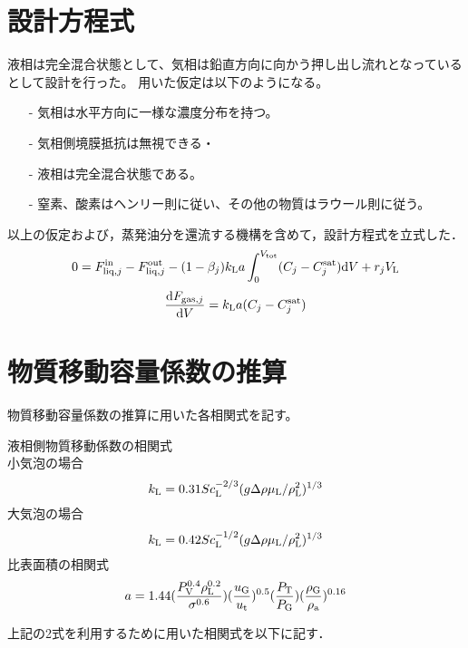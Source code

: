 \documentclass[a4j]{jsreport}
\begin{document}
\section{設計方程式}
液相は完全混合状態として、気相は鉛直方向に向かう押し出し流れとなっているとして設計を行った。
用いた仮定は以下のようになる。
\begin{itemize}
    \item[-] 気相は水平方向に一様な濃度分布を持つ。
    \item[-] 気相側境膜抵抗は無視できる・
    \item[-] 液相は完全混合状態である。
    \item[-] 窒素、酸素はヘンリー則に従い、その他の物質はラウール則に従う。
\end{itemize}
以上の仮定および，蒸発油分を還流する機構を含めて，設計方程式を立式した．\\
\begin{equation}\nonumber
    0=F^{{\rm in}}_{{\rm liq},j}-F^{{\rm out}}_{{\rm liq},j} -(1-\beta_j) k_{{\rm L}}a
    \int^{V_{{\rm tot}}}_0(C_j - C^{{\rm sat}}_j){\rm d}V + r_j V_{{\rm L}}
\end{equation}
\begin{equation}\nonumber
    \frac{{\rm d}F_{{\rm gas},j}}{{\rm d}V} = k_{{\rm L}}a(C_j - C^{{\rm sat}}_j)
\end{equation}

\section{物質移動容量係数の推算}
物質移動容量係数の推算に用いた各相関式を記す。

液相側物質移動係数の相関式\\
小気泡の場合
\begin{equation}
    k_{{\rm L}} = 0.31Sc_{{\rm L}}^{-2/3}(g \Delta \rho \mu_{{\rm L}}/\rho_{{\rm L}}^2)^{1/3}
\end{equation}
大気泡の場合
\begin{equation}
    k_{{\rm L}} = 0.42Sc_{{\rm L}}^{-1/2}(g \Delta \rho \mu_{{\rm L}}/\rho_{{\rm L}}^2)^{1/3}
\end{equation}
比表面積の相関式
\begin{equation}
    a = 1.44(\frac{P_{{\rm V}}^{0.4} \rho_{{\rm L}}^{0.2} }{ \sigma^{0.6}})(\frac{u_{{\rm G}}}{u_{{\rm t}}})^{0.5}(\frac{P_{{\rm T}}}{P_{{\rm G}}})(\frac{\rho_{{\rm G}}}{\rho_{{\rm a}}})^{0.16}
\end{equation}

上記の2式を利用するために用いた相関式を以下に記す．
\end{document}
